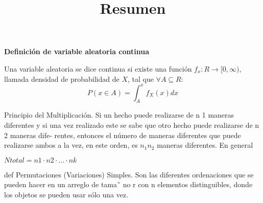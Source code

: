\documentclass[letterpaper,11pt, twocolumn]{article} %
\title{\bfseries Resumen}
\author{}
\date{}
\begin{document}
\textbf{Definición de variable aleatoria continua}
\par

Una variable aleatoria se dice continua si existe una función $f_x : R  \rightarrow [0,\infty)$, llamada densidad de probabilidad de $X$, tal que $\forall A \subseteq R$:
\begin{equation*}
  {P}(x \in A) = \int_{A}^{x} f_X (x) dx
\end{equation*}


Principio del Multiplicación. Si un hecho puede
realizarse de n 1 maneras diferentes y si una vez realizado este se sabe que otro hecho puede realizarse de n 2 maneras dife-
rentes, entonces el número de maneras diferentes que puede realizarse ambos a la vez, en este orden, es $n_1  n_2$ maneras
diferentes. En general

$N total = n 1 · n 2 · ... · n k$


def Permutaciones (Variaciones) Simples. Son las diferentes ordenaciones que se pueden hacer en un arreglo de
tama˜ no r con n elementos distinguibles, donde los objetos se
pueden usar sólo una vez.
\end{document}
